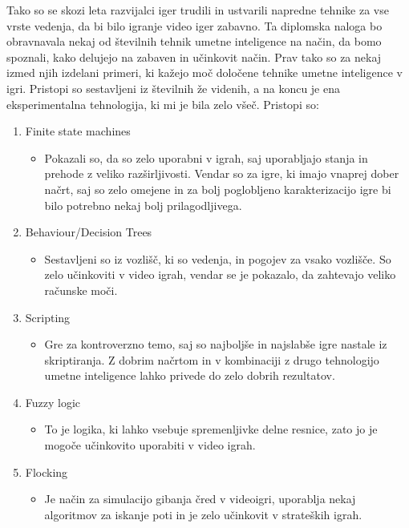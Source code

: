 \documentclass[a4paper,12pt,openright]{book}
\begin{document}
Tako so se skozi leta razvijalci iger trudili in ustvarili napredne tehnike za vse vrste vedenja, da bi bilo igranje video iger zabavno. Ta diplomska naloga bo obravnavala nekaj od številnih tehnik umetne inteligence na način, da bomo spoznali, kako delujejo na zabaven in učinkovit način. Prav tako so za nekaj izmed njih izdelani primeri, ki kažejo moč določene tehnike umetne inteligence v igri. Pristopi so sestavljeni iz številnih že videnih, a na koncu je ena eksperimentalna tehnologija, ki mi je bila zelo všeč. Pristopi so:

\clearpage


\begin{enumerate}
    \item Finite state machines
        \begin{itemize}
            \item Pokazali so, da so zelo uporabni v igrah, saj uporabljajo stanja in prehode z veliko razširljivosti. Vendar so za igre, ki imajo vnaprej dober načrt, saj so zelo omejene in za bolj poglobljeno karakterizacijo igre bi bilo potrebno nekaj bolj prilagodljivega.
        \end{itemize}
    \item Behaviour/Decision Trees
        \begin{itemize}
            \item Sestavljeni so iz vozlišč, ki so vedenja, in pogojev za vsako vozlišče. So zelo učinkoviti v video igrah, vendar se je pokazalo, da zahtevajo veliko računske moči.
        \end{itemize}
    \item Scripting
        \begin{itemize}
            \item Gre za kontroverzno temo, saj so najboljše in najslabše igre nastale iz skriptiranja. Z dobrim načrtom in v kombinaciji z drugo tehnologijo umetne inteligence lahko privede do zelo dobrih rezultatov.
        \end{itemize}
    \item Fuzzy logic
        \begin{itemize}
            \item To je logika, ki lahko vsebuje spremenljivke delne resnice, zato jo je mogoče učinkovito uporabiti v video igrah.
        \end{itemize}
    \item Flocking
        \begin{itemize}
            \item Je način za simulacijo gibanja čred v videoigri, uporablja nekaj algoritmov za iskanje poti in je zelo učinkovit v strateških igrah.

\end{itemize}
\end{enumerate}
\end{document}
